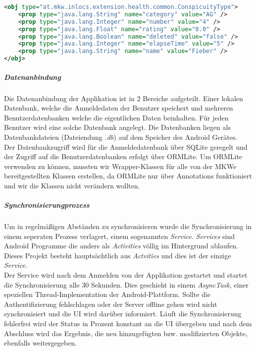 \begin{lstlisting}[language=XML, captionpos=b, caption={CustomItem Beispiel}]
<obj type="at.mkw.inlocs.extension.health.common.ConspicuityType">
	<prop type="java.lang.String" name="category" value="AG" />
	<prop type="java.lang.Integer" name="number" value="4" />
	<prop type="java.lang.Float" name="rating" value="0.0" />
	<prop type="java.lang.Boolean" name="deleted" value="false" />
	<prop type="java.lang.Integer" name="elapseTime" value="5" />
	<prop type="java.lang.String" name="name" value="Fieber" />
</obj>
\end{lstlisting}

\subparagraph{Datenanbindung}
Die Datenanbindung der Applikation ist in 2 Bereiche aufgeteilt. Einer lokalen Datenbank, welche die Anmeldedaten der Benutzer speichert und mehreren Benutzerdatenbanken welche die eigentlichen Daten beinhalten. Für jeden Benutzer wird eine solche Datenbank angelegt. Die Datenbanken liegen als Datenbankdateien (Dateiendung \textit{.db}) auf dem Speicher des Android Gerätes. \\
Der Datenbankzugriff wird für die Anmeldedatenbank über SQLite geregelt und der Zugriff auf die Benutzerdatenbanken erfolgt über ORMLite. Um ORMLite verwenden zu können, mussten wir Wrapper-Klassen für alle von der MKWe bereitgestellten Klassen erstellen, da ORMLite nur über Annotations funktioniert und wir die Klassen nicht verändern wollten.\\


\subparagraph{Synchronisierungprozess}
Um in regelmäßigen Abständen zu synchronisieren wurde die Synchronisierung in einem seperaten Prozess verlagert, einem sogenannten \textit{Service}. \textit{Services} sind Android Programme die anders als \textit{Activities} völlig im Hintergrund ablaufen. Dieses Projekt besteht hauptsächtlich aus \textit{Actvities} und dies ist der einzige \textit{Service}.\\
Der Service wird nach dem Anmelden von der Applikation gestartet und startet die Synchronisierung alle 30 Sekunden. Dies geschieht in einem \textit{AsyncTask}, einer speziellen Thread-Implementation der Android-Plattform. Sollte die Authentifizierung fehlschlagen oder der Server offline gehen wird nicht synchronisiert und die UI wird darüber informiert. Läuft die Synchronisierung fehlerfrei wird der Status in Prozent konstant an die UI übergeben und nach dem Abschluss wird das Ergebnis, die neu hinzugefügten bzw. modifizierten Objekte, ebenfalls weitergegeben.

